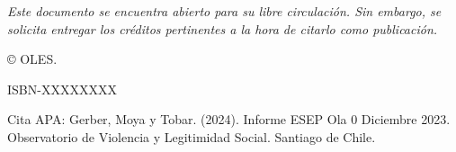 \null\vfill
\begin{flushleft}
\thispagestyle{empty}
\textit{Este documento se encuentra abierto para su libre circulación. Sin embargo, se solicita entregar los créditos pertinentes a la hora de citarlo como publicación.}

© OLES. 

ISBN-XXXXXXXX

\noindent Cita APA: Gerber, Moya y Tobar. (2024). Informe ESEP Ola 0 Diciembre 2023.  Observatorio de Violencia y Legitimidad Social. Santiago de Chile.

\end{flushleft}
